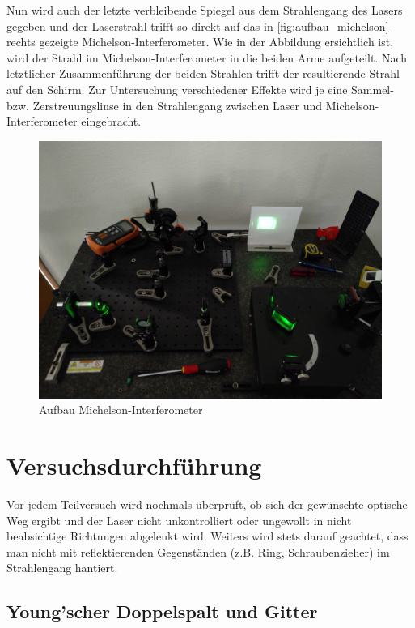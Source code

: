 \documentclass[ngerman]{scrartcl}
\begin{document}
Nun wird auch der letzte verbleibende Spiegel aus dem Strahlengang des Lasers gegeben und der Laserstrahl trifft so direkt auf das in \autoref{fig:aufbau_michelson} rechts gezeigte Michelson-Interferometer. Wie in der Abbildung ersichtlich ist, wird der Strahl im Michelson-Interferometer in die beiden Arme aufgeteilt. Nach letztlicher Zusammenführung der beiden Strahlen trifft der resultierende Strahl auf den Schirm.
Zur Untersuchung verschiedener Effekte wird je eine Sammel- bzw. Zerstreuungslinse in den Strahlengang zwischen Laser und Michelson-Interferometer eingebracht.
%
\begin{figure}[H]
    \centering
    \begin{samepage}
        \includegraphics[width=0.7\linewidth]{fig/Compressed/aufbau_michelson.jpg}
        \caption{Aufbau Michelson-Interferometer}
        \label{fig:aufbau_michelson}
    \end{samepage}
\end{figure}


\newpage
\section{Versuchsdurchführung}
\label{sec:durchfuehrung}

Vor jedem Teilversuch wird nochmals überprüft, ob sich der gewünschte optische Weg ergibt und der Laser nicht unkontrolliert oder ungewollt in nicht beabsichtige Richtungen abgelenkt wird. Weiters wird stets darauf geachtet, dass man nicht mit reflektierenden Gegenständen (z.B. Ring, Schraubenzieher) im Strahlengang hantiert.

\subsection{Young'scher Doppelspalt und Gitter}
\label{sec:durchfuehrung_doppelspalt_gitter}
\end{document}
